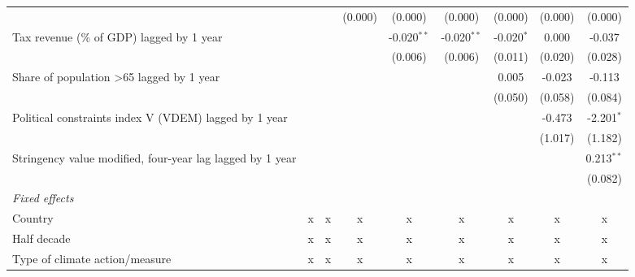 \begin{tabular}{lcccccccc}
                                                             &              &               & (0.000)     & (0.000)       & (0.000)       & (0.000)      & (0.000) & (0.000)\\   
   Tax revenue (\% of GDP) lagged by 1 year                  &              &               &             & -0.020$^{**}$ & -0.020$^{**}$ & -0.020$^{*}$ & 0.000   & -0.037\\   
                                                             &              &               &             & (0.006)       & (0.006)       & (0.011)      & (0.020) & (0.028)\\   
   Share of population >65 lagged by 1 year                  &              &               &             &               &               & 0.005        & -0.023  & -0.113\\   
                                                             &              &               &             &               &               & (0.050)      & (0.058) & (0.084)\\   
   Political constraints index V (VDEM) lagged by 1 year     &              &               &             &               &               &              & -0.473  & -2.201$^{*}$\\   
                                                             &              &               &             &               &               &              & (1.017) & (1.182)\\   
   Stringency value modified, four-year lag lagged by 1 year &              &               &             &               &               &              &         & 0.213$^{**}$\\   
                                                             &              &               &             &               &               &              &         & (0.082)\\   
   \emph{Fixed effects}\\
   Country                                                   & x            & x             & x           & x             & x             & x            & x       & x\\  
   Half decade                                               & x            & x             & x           & x             & x             & x            & x       & x\\  
   Type of climate action/measure                            & x            & x             & x           & x             & x             & x            & x       & x\\  

\end{tabular}
